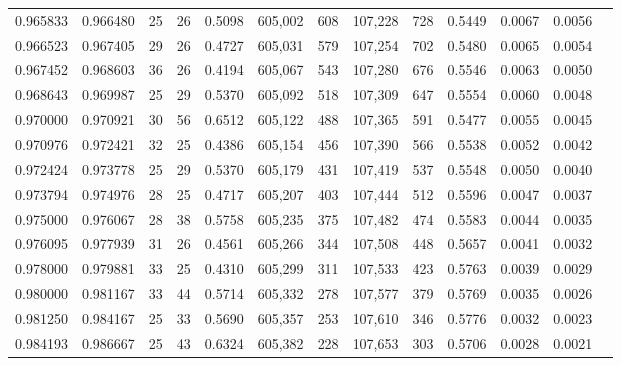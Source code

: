 \begin{tabular}{rrrrrrrrrrrrr}
0.965833 & 0.966480 &    25 &  26 &                                     0.5098 & 605,002 &     608 & 107,228 &     728 & 0.5449 & 0.0067 & 0.0056 \\
0.966523 & 0.967405 &    29 &  26 &                                     0.4727 & 605,031 &     579 & 107,254 &     702 & 0.5480 & 0.0065 & 0.0054 \\
0.967452 & 0.968603 &    36 &  26 &                                     0.4194 & 605,067 &     543 & 107,280 &     676 & 0.5546 & 0.0063 & 0.0050 \\
0.968643 & 0.969987 &    25 &  29 &                                     0.5370 & 605,092 &     518 & 107,309 &     647 & 0.5554 & 0.0060 & 0.0048 \\
0.970000 & 0.970921 &    30 &  56 &                                     0.6512 & 605,122 &     488 & 107,365 &     591 & 0.5477 & 0.0055 & 0.0045 \\
0.970976 & 0.972421 &    32 &  25 &                                     0.4386 & 605,154 &     456 & 107,390 &     566 & 0.5538 & 0.0052 & 0.0042 \\
0.972424 & 0.973778 &    25 &  29 &                                     0.5370 & 605,179 &     431 & 107,419 &     537 & 0.5548 & 0.0050 & 0.0040 \\
0.973794 & 0.974976 &    28 &  25 &                                     0.4717 & 605,207 &     403 & 107,444 &     512 & 0.5596 & 0.0047 & 0.0037 \\
0.975000 & 0.976067 &    28 &  38 &                                     0.5758 & 605,235 &     375 & 107,482 &     474 & 0.5583 & 0.0044 & 0.0035 \\
0.976095 & 0.977939 &    31 &  26 &                                     0.4561 & 605,266 &     344 & 107,508 &     448 & 0.5657 & 0.0041 & 0.0032 \\
0.978000 & 0.979881 &    33 &  25 &                                     0.4310 & 605,299 &     311 & 107,533 &     423 & 0.5763 & 0.0039 & 0.0029 \\
0.980000 & 0.981167 &    33 &  44 &                                     0.5714 & 605,332 &     278 & 107,577 &     379 & 0.5769 & 0.0035 & 0.0026 \\
0.981250 & 0.984167 &    25 &  33 &                                     0.5690 & 605,357 &     253 & 107,610 &     346 & 0.5776 & 0.0032 & 0.0023 \\
0.984193 & 0.986667 &    25 &  43 &                                     0.6324 & 605,382 &     228 & 107,653 &     303 & 0.5706 & 0.0028 & 0.0021 \\

\end{tabular}
